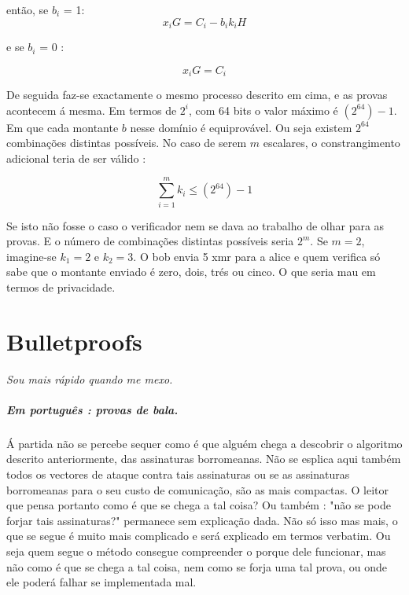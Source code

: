 então, se $b_i$ = 1:
\vspace{.175cm}
\[x_i G = C_{i} - b_i k_i H \]
\vspace{.175cm}

e se $b_i$ = 0 :

\vspace{.175cm}
\[x_i G = C_{i} \]
\vspace{.175cm}


De seguida faz-se exactamente o mesmo processo descrito em cima, e as provas acontecem á mesma. Em termos de $2^i$, com 64 bits o valor máximo é $(2^{64})-1$. Em que cada montante $b$ nesse domínio é equiprovável. Ou seja existem $2^{64}$ combinações distintas possíveis. No caso de serem $m$ escalares, o constrangimento adicional teria de ser válido : 

\[\sum_{i=1}^{m} k_i \leq (2^{64})-1 \]

Se isto não fosse o caso o verificador nem se dava ao trabalho de olhar para as provas. E o número de combinações distintas possíveis seria $2^m$. Se $m=2$, imagine-se $k_1=2$ e $k_2=3$. O bob envia 5 xmr para a alice e quem verifica só sabe que o montante enviado é zero, dois, trés ou cinco. O que seria mau em termos de privacidade. 

\section{Bulletproofs}
\label{sec:bullet_proofs}

\centerline{{\it Sou mais rápido quando me mexo.}}
\centerline{\quad \quad \quad \quad \quad \quad \quad \quad \quad \quad \quad \quad \quad \quad {}}

\subparagraph{Em português : provas de bala.\newline}

Á partida não se percebe sequer como é que alguém chega a descobrir o algoritmo descrito anteriormente, das assinaturas borromeanas. Não se esplica aqui também todos os vectores de ataque contra tais assinaturas ou se as assinaturas borromeanas para o seu custo de comunicação, são as mais compactas. O leitor que pensa portanto como é que se chega a tal coisa? Ou também : "não se pode forjar tais assinaturas?" permanece sem explicação dada. Não só isso mas mais, o que se segue é muito mais complicado e será explicado em termos verbatim. Ou seja quem segue o método consegue compreender o porque dele funcionar, mas não como é que se chega a tal coisa, nem como se forja uma tal prova, ou onde ele poderá falhar se implementada mal.

